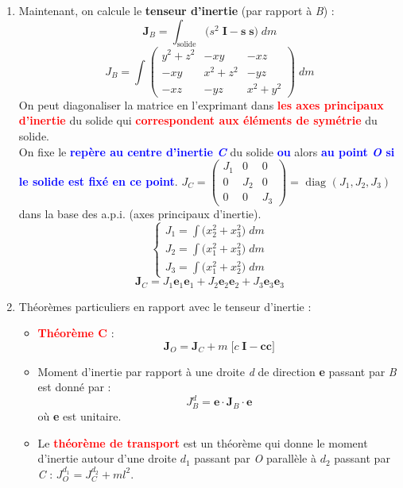 \documentclass[a4paper]{article}
\begin{document}
\begin{enumerate}
\item Maintenant, on calcule le \textbf{tenseur d'inertie} (par rapport à \emph{B}) : 
\[ \textbf{J}_B = \int_{\text{solide}} \Big( s^2 \; \textbf{I} - \textbf{s} \; \textbf{s} \Big) \; d m \]
\[ J_B = \int \begin{pmatrix} y^2 + z^2 & - x y & - x z \\ - x y & x^2 + z^2 & - y z \\ - x z & - y z & x^2 + y^2 \end{pmatrix} \; d m \]
On peut diagonaliser la matrice en l'exprimant dans \textcolor{red}{\textbf{les axes principaux d'inertie}} du solide qui \textcolor{red}{\textbf{correspondent aux éléments de symétrie}} du solide. \\
On fixe le \textcolor{blue}{\textbf{repère au centre d'inertie \emph{C}}} du solide \textcolor{blue}{\textbf{ou}} alors \textcolor{blue}{\textbf{au point \emph{O} si le solide est fixé en ce point}}.
$ J_C = \begin{pmatrix} J_1 & 0 & 0 \\ 0 & J_2 & 0 \\ 0 & 0 & J_3 \end{pmatrix} = \text{ diag } (J_1, J_2, J_3) $ dans la base des a.p.i. (axes principaux d'inertie).
\begin{equation*} \begin{cases} \displaystyle
J_1 = \int \Big( x_2^2 + x_3^2 \Big) \; d m \\ \displaystyle
J_2 = \int \Big( x_1^2 + x_3^2 \Big) \; d m\\ \displaystyle
J_3 = \int \Big( x_1^2 + x_2^2 \Big) \; d m
\end{cases} \end{equation*}
\[ \textbf{J}_C = J_1 \textbf{e}_1 \textbf{e}_1 + J_2 \textbf{e}_2 \textbf{e}_2 + J_3 \textbf{e}_3 \textbf{e}_3 \]





\item Théorèmes particuliers en rapport avec le tenseur d'inertie : 
\begin{itemize}
    \item \textcolor{red}{\textbf{\danger Théorème C}} : 
\[  \textbf{J}_O = \textbf{J}_C + m \; \Big[ c \; \textbf{I} - \textbf{c} \textbf{c} \Big] \]
    \item Moment d'inertie par rapport à une droite \emph{d} de direction \textbf{e} passant par \emph{B} est donné par : 
\[ J_B^d = \textbf{e} \cdot \textbf{J}_B \cdot \textbf{e} \]
où \textbf{e} est unitaire.
    \item Le \textcolor{red}{\textbf{théorème de transport}} est un théorème qui donne le moment d'inertie autour d'une droite $ d_1 $ passant par \emph{O} parallèle à $ d_2 $ passant par \emph{C} : $\displaystyle J_O^{d_1} = J_C^{d_2} + m l^2 $.
\end{itemize}






\end{enumerate}
\end{document}
